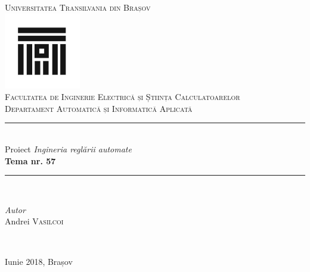 \documentclass[11pt]{article}
\author{Andrei Vasilcoi}
\begin{document}
\begin{titlepage}

\newcommand{\HRule}{\rule{\linewidth}{0.5mm}}
	
\begin{center}
\textsc{\LARGE Universitatea Transilvania din Brașov}\\[0.5cm]
\includegraphics[width=0.25\textwidth]{logo_ut.jpg}\\[0.5cm]
\textsc{\Large Facultatea de Inginerie Electrică și Știința Calculatoarelor}\\[0.5cm]
\textsc{\large Departament Automatică și Informatică Aplicată}\\[1.5cm]
\HRule\\[0.5cm]
{\Large Proiect \textit{Ingineria reglării automate}}\\[0.5cm]
{\LARGE\bfseries Tema nr. 57}\\[0.5cm]
\HRule\\[2.5cm]
\begin{minipage}{1\textwidth}
	\begin{flushleft}
		\large
		\textit{Autor}\\
		Andrei \textsc{Vasilcoi}\\
	\end{flushleft}
\end{minipage}
~
\end{center}
\centering
\vspace{5cm}
{\large Iunie 2018, Brașov}\\[5cm]
\end{titlepage}

\newpage
{}
\tableofcontents

\newpage	
\end{document}
